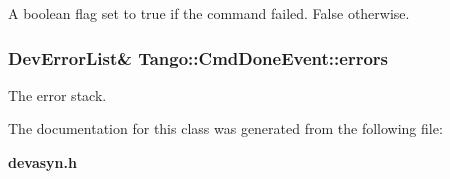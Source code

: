 A boolean flag set to true if the command failed. False otherwise. 

\subsubsection[{errors}]{\setlength{\rightskip}{0pt plus 5cm}Dev\-Error\-List\& Tango\-::\-Cmd\-Done\-Event\-::errors}\label{classTango_1_1CmdDoneEvent_ad6842cac8f28ad790a3a19bd4818390e}


The error stack. 



The documentation for this class was generated from the following file\-:\begin{DoxyCompactItemize}
\item 
{\bf devasyn.\-h}\end{DoxyCompactItemize}
